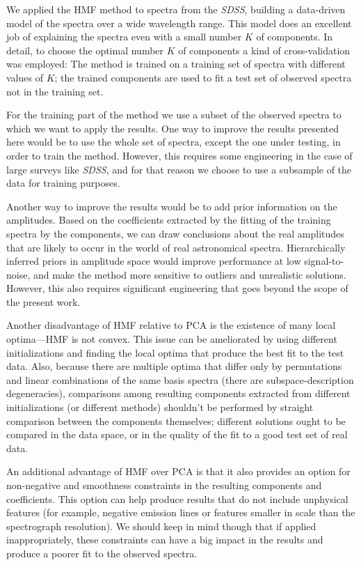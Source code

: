 \documentclass[12pt,preprint]{aastex}
\newcommand{\project}[1]{\textsl{#1}}
\newcommand{\sdss}{\project{SDSS}}
\newcommand{\SDSS}{\sdss}
\begin{document}
We applied the HMF method to spectra from the \SDSS, building a data-driven
model of the spectra over a wide wavelength range.  This model does an
excellent job of explaining the spectra even with a small number $K$
of components.  In detail, to choose the optimal number $K$ of
components a kind of cross-validation was employed: The method is
trained on a training set of spectra with different values of $K$; the
trained components are used to fit a test set of observed spectra not
in the training set.

For the training part of the method we use a subset of the observed
spectra to which we want to apply the results. One way to improve the
results presented here would be to use the whole set of spectra,
except the one under testing, in order to train the method. However,
this requires some engineering in the case of large surveys like
\SDSS, and for that reason we choose to use a subsample of the data
for training purposes.

Another way to improve the results would be to add prior information
on the amplitudes. Based on the coefficients extracted by the fitting
of the training spectra by the components, we can draw conclusions
about the real amplitudes that are likely to occur in the world of
real astronomical spectra.  Hierarchically inferred priors in
amplitude space would improve performance at low signal-to-noise, and
make the method more sensitive to outliers and unrealistic solutions.
However, this also requires significant engineering that goes beyond
the scope of the present work.

Another disadvantage of HMF relative to PCA is the existence of many
local optima---HMF is not convex.  This issue can be ameliorated by
using different initializations and finding the local optima that
produce the best fit to the test data.  Also, because there are
multiple optima that differ only by permutations and linear
combinations of the same basis spectra (there are subspace-description
degeneracies), comparisons among resulting components extracted from
different initializations (or different methods) shouldn't be performed
by straight comparison between the components themselves; different
solutions ought to be compared in the data space, or in the quality of
the fit to a good test set of real data.

An additional advantage of HMF over PCA is that it
also provides an option for non-negative and smoothness constraints in
the resulting components and coefficients.  This option can help
produce results that do not include unphysical features (for example,
negative emission lines or features smaller in scale than the
spectrograph resolution). We should keep in mind though that if
applied inappropriately, these constraints can have a big impact in
the results and produce a poorer fit to the observed spectra.
\end{document}
